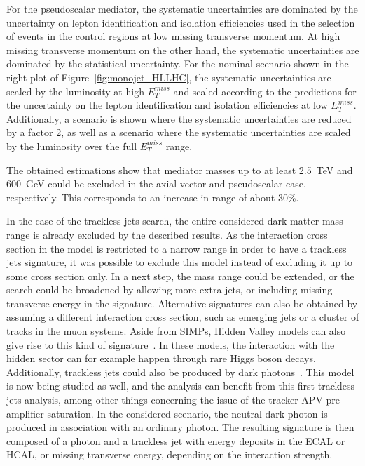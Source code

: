 For the pseudoscalar mediator, 
the systematic uncertainties are dominated by the uncertainty on lepton identification and isolation efficiencies used in the selection of events in the control regions at low missing transverse momentum. At high missing transverse momentum on the other hand, the systematic uncertainties are dominated by the statistical uncertainty. For the nominal scenario shown in the right plot of Figure~\ref{fig:monojet_HLLHC}, the systematic uncertainties are scaled by the luminosity at high $E_T^{miss}$ and scaled according to the predictions for the uncertainty on the lepton identification and isolation efficiencies at low $E_T^{miss}$. Additionally, a scenario is shown where the systematic uncertainties are reduced by a factor 2, as well as a scenario where the systematic uncertainties are scaled by the luminosity over the full $E_T^{miss}$ range. 

The obtained estimations show that mediator masses up to at least \SI{2.5}{TeV} and \SI{600}{GeV} could be excluded in the axial-vector and pseudoscalar case, respectively. This corresponds to an increase in range of about 30\%.

In the case of the trackless jets search, the entire considered dark matter mass range is already excluded by the described results. As the interaction cross section in the model is restricted to a narrow range in order to have a trackless jets signature, it was possible to exclude this model instead of excluding it up to some cross section only. In a next step, the mass range could be extended, or the search could be broadened by allowing more extra jets, or including missing transverse energy in the signature. Alternative signatures can also be obtained by assuming a different interaction cross section, such as emerging jets or a cluster of tracks in the muon systems. Aside from \acp{SIMP}, Hidden Valley models can also give rise to this kind of signature~\cite{Strassler:2006im}. In these models, the interaction with the hidden sector can for example happen through rare Higgs boson decays. Additionally, trackless jets could also be produced by dark photons~\cite{Izaguirre:2015eya}. This model is now being studied as well, and the analysis can benefit from this first trackless jets analysis, among other things concerning the issue of the tracker APV pre-amplifier saturation. In the considered scenario, the neutral dark photon is produced in association with an ordinary photon. The resulting signature is then composed of a photon and a trackless jet with energy deposits in the \ac{ECAL} or \ac{HCAL}, or missing transverse energy, depending on the interaction strength. 



\clearpage{\pagestyle{empty}\cleardoublepage}
